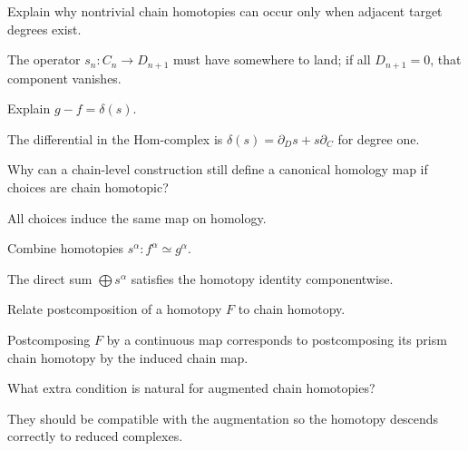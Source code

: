\begin{problem}\label{prob:viii22-13}
Explain why nontrivial chain homotopies can occur only when adjacent target degrees exist.
\end{problem}
\begin{solution}
The operator \(s_n:C_n\to D_{n+1}\) must have somewhere to land; if all \(D_{n+1}=0\), that component vanishes.
\end{solution}

\begin{problem}\label{prob:viii22-14}
Explain \(g-f=\delta(s)\).
\end{problem}
\begin{solution}
The differential in the Hom-complex is \(\delta(s)=\partial_Ds+s\partial_C\) for degree one.
\end{solution}

\begin{problem}\label{prob:viii22-15}
Why can a chain-level construction still define a canonical homology map if choices are chain homotopic?
\end{problem}
\begin{solution}
All choices induce the same map on homology.
\end{solution}

\begin{problem}\label{prob:viii22-16}
Combine homotopies \(s^\alpha:f^\alpha\simeq g^\alpha\).
\end{problem}
\begin{solution}
The direct sum \(\bigoplus s^\alpha\) satisfies the homotopy identity componentwise.
\end{solution}

\begin{problem}\label{prob:viii22-17}
Relate postcomposition of a homotopy \(F\) to chain homotopy.
\end{problem}
\begin{solution}
Postcomposing \(F\) by a continuous map corresponds to postcomposing its prism chain homotopy by the induced chain map.
\end{solution}

\begin{problem}[Augmentation]\label{prob:viii22-18}
What extra condition is natural for augmented chain homotopies?
\end{problem}
\begin{solution}
They should be compatible with the augmentation so the homotopy descends correctly to reduced complexes.
\end{solution}

